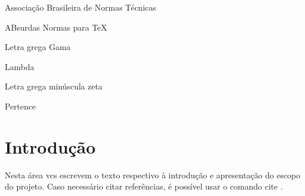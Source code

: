 \documentclass[12pt, oneside, a4paper, chapter=TITLE,section=TITLE]{abntex2}
\begin{document}
\frenchspacing

\pretextual
\imprimircapa %
\imprimirfolhaderosto %


 \listoffigures*
\cleardoublepage

\listoftables*
\cleardoublepage

 \listofquadros*
\cleardoublepage

\begin{siglas}
  \item[ABNT] Associação Brasileira de Normas Técnicas
  \item[abnTeX] ABsurdas Normas para TeX
\end{siglas}


\begin{simbolos}
  \item[$ \Gamma $] Letra grega Gama
  \item[$ \Lambda $] Lambda
  \item[$ \zeta $] Letra grega minúscula zeta
  \item[$ \in $] Pertence
\end{simbolos}



\tableofcontents*


\textual

\chapter{Introdução}

Nesta área vcs escrevem o texto respectivo à introdução e apresentação do escopo do projeto. \cite{thinking2020design} Caso necessário citar referências, é possível usar o comando cite{} \cite{abntex2classe}.
\end{document}
